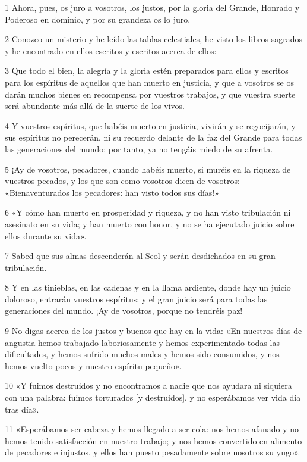 \par 1 Ahora, pues, os juro a vosotros, los justos, por la gloria del Grande, Honrado y Poderoso en dominio, y por su grandeza os lo juro.
\par 2 Conozco un misterio y he leído las tablas celestiales, he visto los libros sagrados y he encontrado en ellos escritos y escritos acerca de ellos:
\par 3 Que todo el bien, la alegría y la gloria estén preparados para ellos y escritos para los espíritus de aquellos que han muerto en justicia, y que a vosotros se os darán muchos bienes en recompensa por vuestros trabajos, y que vuestra suerte será abundante más allá de la suerte de los vivos.
\par 4 Y vuestros espíritus, que habéis muerto en justicia, vivirán y se regocijarán, y sus espíritus no perecerán, ni su recuerdo delante de la faz del Grande para todas las generaciones del mundo: por tanto, ya no tengáis miedo de su afrenta.
\par 5 ¡Ay de vosotros, pecadores, cuando habéis muerto, si muréis en la riqueza de vuestros pecados, y los que son como vosotros dicen de vosotros: «Bienaventurados los pecadores: han visto todos sus días!»
\par 6 «Y cómo han muerto en prosperidad y riqueza, y no han visto tribulación ni asesinato en su vida; y han muerto con honor, y no se ha ejecutado juicio sobre ellos durante su vida».
\par 7 Sabed que sus almas descenderán al Seol y serán desdichados en su gran tribulación.
\par 8 Y en las tinieblas, en las cadenas y en la llama ardiente, donde hay un juicio doloroso, entrarán vuestros espíritus; y el gran juicio será para todas las generaciones del mundo. ¡Ay de vosotros, porque no tendréis paz!
\par 9 No digas acerca de los justos y buenos que hay en la vida: «En nuestros días de angustia hemos trabajado laboriosamente y hemos experimentado todas las dificultades, y hemos sufrido muchos males y hemos sido consumidos, y nos hemos vuelto pocos y nuestro espíritu pequeño».
\par 10 «Y fuimos destruidos y no encontramos a nadie que nos ayudara ni siquiera con una palabra: fuimos torturados [y destruidos], y no esperábamos ver vida día tras día».
\par 11 «Esperábamos ser cabeza y hemos llegado a ser cola: nos hemos afanado y no hemos tenido satisfacción en nuestro trabajo; y nos hemos convertido en alimento de pecadores e injustos, y ellos han puesto pesadamente sobre nosotros su yugo».
